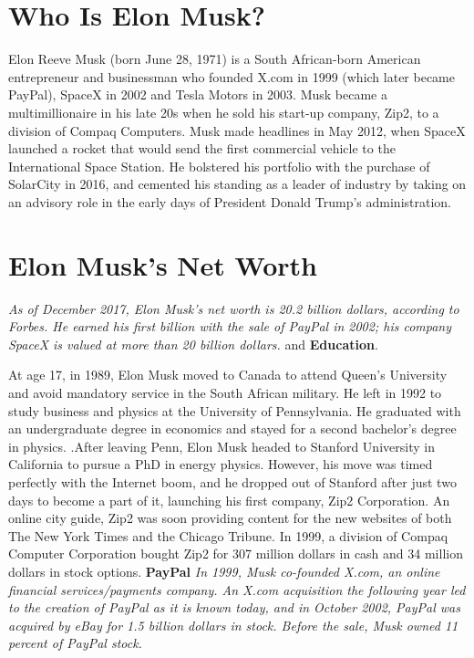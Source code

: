 \documentclass{article}                    %
\begin{document}
 
\section{{\textbf{Who Is Elon Musk?}}}                %
Elon Reeve Musk (born June 28, 1971) is a South African-born American entrepreneur and businessman who founded X.com in 1999 (which later became PayPal), SpaceX in 2002 and Tesla Motors in 2003. Musk became a multimillionaire in his late 20s when he sold his start-up company, Zip2, to a division of Compaq Computers. Musk made headlines in May 2012, when SpaceX launched a rocket that would send the first commercial vehicle to the International Space Station. He bolstered his portfolio with the purchase of SolarCity in 2016, and cemented his standing as a leader of industry by taking on an advisory role in the early days of President Donald Trump's administration.
\section{{\textbf{Elon Musk’s Net Worth}}}
\textit{As of December 2017, Elon Musk’s net worth is 20.2 billion dollars, according to Forbes. He earned his first billion with the sale of PayPal in 2002; his company SpaceX is valued at more than 20 billion dollars.} and 
\textbf{Education}.

{\small At age 17, in 1989, Elon Musk moved to Canada to attend Queen’s University and avoid mandatory service in the South African military. He left in 1992 to study business and physics at the University of Pennsylvania. He graduated with an undergraduate degree in economics and stayed for a second bachelor’s degree in physics.
.}After leaving Penn, Elon Musk headed to Stanford University in California to pursue a PhD in energy physics. However, his move was timed perfectly with the Internet boom, and he dropped out of Stanford after just two days to become a part of it, launching his first company, Zip2 Corporation. An online city guide, Zip2 was soon providing content for the new websites of both The New York Times and the Chicago Tribune. In 1999, a division of Compaq Computer Corporation bought Zip2 for 307 million dollars in cash and 34 million dollars in stock options. 
\textbf{PayPal}
\textit{In 1999, Musk co-founded X.com, an online financial services/payments company. An X.com acquisition the following year led to the creation of PayPal as it is known today, and in October 2002, PayPal was acquired by eBay for 1.5 billion dollars in stock. Before the sale, Musk owned 11 percent of PayPal stock.}
  
\end{document}
